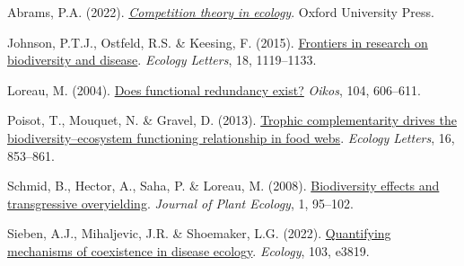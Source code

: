 \documentclass[
  letterpaper,
  DIV=11,
  numbers=noendperiod]{scrartcl}
\newlength{\cslhangindent}
\newenvironment{CSLReferences}[2] %
 {\begin{list}{}{%
  \setlength{\itemindent}{0pt}
  \setlength{\leftmargin}{0pt}
  \setlength{\parsep}{0pt}
  \ifodd #1
   \setlength{\leftmargin}{\cslhangindent}
   \setlength{\itemindent}{-1\cslhangindent}
  \fi
  \setlength{\itemsep}{#2\baselineskip}}}
 {\end{list}}
\begin{document}
\label{refs}
\begin{CSLReferences}{1}{0}
Abrams, P.A. (2022).
\emph{\href{https://books.google.ca/books?hl=en&lr=&id=fTaFEAAAQBAJ&oi=fnd&pg=PP1&dq=abrams+2022+competition+theory&ots=_cdJwLVcq_&sig=ZUB2hKd4WD_YZsynGVHu114pnJ4}{Competition
theory in ecology}}. Oxford University Press.

Johnson, P.T.J., Ostfeld, R.S. \& Keesing, F. (2015).
\href{https://doi.org/10.1111/ele.12479}{Frontiers in research on
biodiversity and disease}. \emph{Ecology Letters}, 18, 1119--1133.

Loreau, M. (2004).
\href{https://doi.org/10.1111/j.0030-1299.2004.12685.x}{Does functional
redundancy exist?} \emph{Oikos}, 104, 606--611.

Poisot, T., Mouquet, N. \& Gravel, D. (2013).
\href{https://doi.org/10.1111/ele.12118}{Trophic complementarity drives
the biodiversity--ecosystem functioning relationship in food webs}.
\emph{Ecology Letters}, 16, 853--861.

Schmid, B., Hector, A., Saha, P. \& Loreau, M. (2008).
\href{https://academic.oup.com/jpe/article-abstract/1/2/95/989985}{Biodiversity
effects and transgressive overyielding}. \emph{Journal of Plant
Ecology}, 1, 95--102.

Sieben, A.J., Mihaljevic, J.R. \& Shoemaker, L.G. (2022).
\href{https://doi.org/10.1002/ecy.3819}{Quantifying mechanisms of
coexistence in disease ecology}. \emph{Ecology}, 103, e3819.

\end{CSLReferences}
\end{document}
